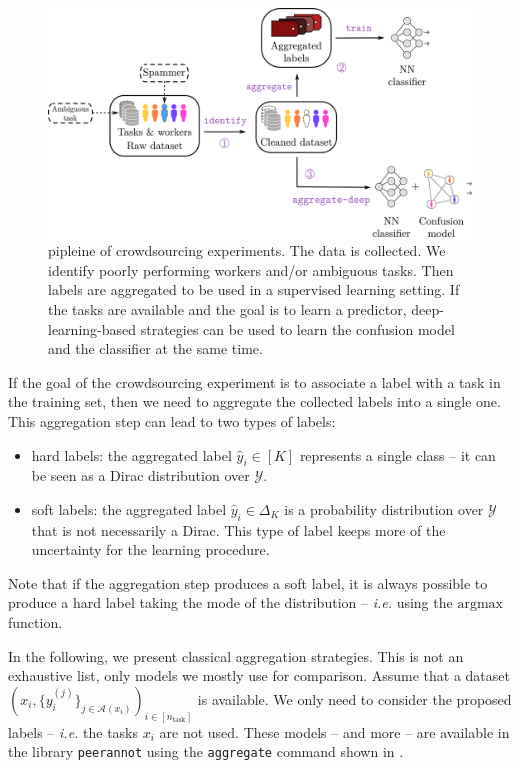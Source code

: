 \begin{figure}[ht]
    \centering
    \includegraphics[width=\textwidth]{chapters/images/strategies_crowd_data.pdf}
    \caption{pipleine of crowdsourcing experiments. The data is collected. We identify poorly performing workers and/or ambiguous tasks. Then labels are aggregated to be used in a supervised learning setting. If the tasks are available and the goal is to learn a predictor, deep-learning-based strategies can be used to learn the confusion model and the classifier at the same time.}
    \label{fig:pipeline_crowdsourcing}
\end{figure}

If the goal of the crowdsourcing experiment is to associate a label with a task in the training set, then we need to aggregate the collected labels into a single one.
This aggregation step can lead to two types of labels:
\begin{itemize}
    \item hard labels: the aggregated label $\hat y_i\in [K]$ represents a single class -- it can be seen as a Dirac distribution over $\mathcal{Y}$.
    \item soft labels: the aggregated label $\hat y_i\in\Delta_K$ is a probability distribution over $\mathcal{Y}$ that is not necessarily a Dirac. This type of label keeps more of the uncertainty for the learning procedure.
\end{itemize}
Note that if the aggregation step produces a soft label, it is always possible to produce a hard label taking the mode of the distribution -- \emph{i.e.} using the $\mathrm{argmax}$ function.

In the following, we present classical aggregation strategies.
This is not an exhaustive list, only models we mostly use for comparison.
Assume that a dataset $\left(x_i, \{y_i^{(j)}\}_{j\in\mathcal{A}(x_i)}\right)_{i\in [n_\text{task}]}$ is available.
We only need to consider the proposed labels -- \emph{i.e.} the tasks $x_i$ are not used.
These models -- and more -- are available in the library \texttt{peerannot} using the \texttt{aggregate} command shown in .

